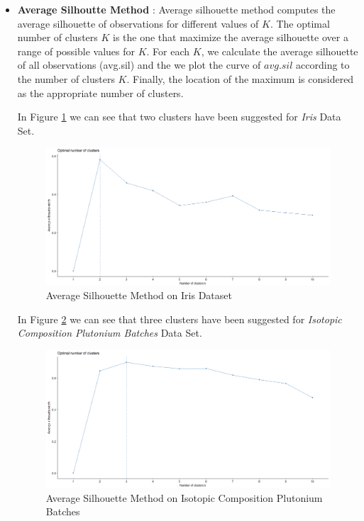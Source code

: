 \begin{itemize}
\item \textbf{Average Silhoutte Method} : Average silhouette method computes the average silhouette of observations
for different values of $K$. The optimal number of clusters $K$ is the one that maximize the average silhouette over
a range of possible values for $K$. For each $K$, we calculate the average silhouette of all observations (avg.sil)
and the we plot the curve of $avg.sil$ according to the number of clusters $K$. Finally, the location of the maximum
is considered as the appropriate number of clusters.

In Figure \ref{fig:silhoutte1} we can see that two clusters have been suggested for \textit{Iris} Data Set.

\begin{figure}[h!]
  \centering
  \includegraphics[scale=1.2]{figures/results/iris/silhouette.png}
  \caption{Average Silhouette Method on Iris Dataset}
  \label{fig:silhoutte1}
\end{figure}

In Figure \ref{fig:silhoutte2} we can see that three clusters have been suggested for \textit{Isotopic Composition Plutonium Batches} Data Set.

\begin{figure}[h!]
  \centering
  \includegraphics[scale=1.3]{figures/results/pluton/silhouette.png}
  \caption{Average Silhouette Method on Isotopic Composition Plutonium Batches}
  \label{fig:silhoutte2}
\end{figure}


\end{itemize}
